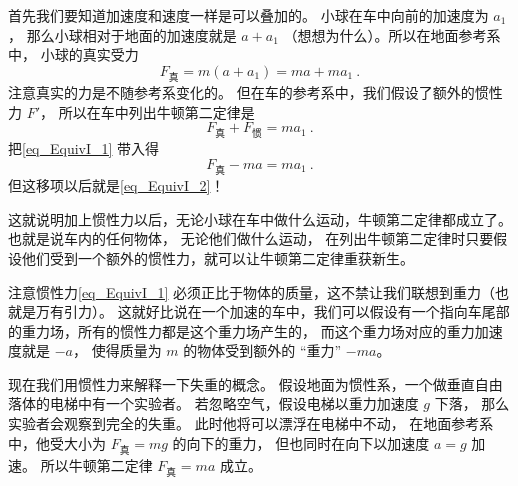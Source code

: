 首先我们要知道加速度和速度一样是可以叠加的。 小球在车中向前的加速度为 $a_1$， 那么小球相对于地面的加速度就是 $a + a_1$ （想想为什么）。所以在地面参考系中， 小球的真实受力
\begin{equation}\label{eq_EquivI_2}
F_\text{真} = m(a + a_1) = ma + ma_1~.
\end{equation}
注意真实的力是不随参考系变化的。 但在车的参考系中，我们假设了额外的惯性力 $F'$， 所以在车中列出牛顿第二定律是
\begin{equation}
F_\text{真} + F_\text{惯} = ma_1~.
\end{equation}
把\autoref{eq_EquivI_1} 带入得
\begin{equation}
F_\text{真} -ma = ma_1~.
\end{equation}
但这移项以后就是\autoref{eq_EquivI_2}！

这就说明加上惯性力以后，无论小球在车中做什么运动，牛顿第二定律都成立了。也就是说车内的任何物体， 无论他们做什么运动， 在列出牛顿第二定律时只要假设他们受到一个额外的惯性力，就可以让牛顿第二定律重获新生。

注意惯性力\autoref{eq_EquivI_1} 必须正比于物体的质量，这不禁让我们联想到重力（也就是万有引力）。 这就好比说在一个加速的车中，我们可以假设有一个指向车尾部的重力场，所有的惯性力都是这个重力场产生的， 而这个重力场对应的重力加速度就是 $-a$， 使得质量为 $m$ 的物体受到额外的 “重力” $-ma$。

现在我们用惯性力来解释一下失重的概念。 假设地面为惯性系，一个做垂直自由落体的电梯中有一个实验者。 若忽略空气，假设电梯以重力加速度 $g$ 下落， 那么实验者会观察到完全的失重。 此时他将可以漂浮在电梯中不动， 在地面参考系中，他受大小为 $F_\text{真}=mg$ 的向下的重力， 但也同时在向下以加速度 $a = g$ 加速。 所以牛顿第二定律 $F_\text{真}=ma$ 成立。
